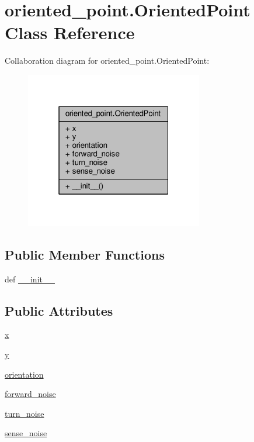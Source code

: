 \hypertarget{classoriented__point_1_1OrientedPoint}{\section{oriented\-\_\-point.\-Oriented\-Point Class Reference}
\label{classoriented__point_1_1OrientedPoint}
}


Collaboration diagram for oriented\-\_\-point.\-Oriented\-Point\-:\nopagebreak
\begin{figure}[H]
\begin{center}
\leavevmode
\includegraphics[width=220pt]{classoriented__point_1_1OrientedPoint__coll__graph}
\end{center}
\end{figure}
\subsection*{Public Member Functions}
\begin{DoxyCompactItemize}
\item 
def \hyperlink{classoriented__point_1_1OrientedPoint_a01289ef0dcb80af4b61c4c8352c82639}{\-\_\-\-\_\-init\-\_\-\-\_\-}
\end{DoxyCompactItemize}
\subsection*{Public Attributes}
\begin{DoxyCompactItemize}
\item 
\hyperlink{classoriented__point_1_1OrientedPoint_a020fc32ac0c377591b1d7686c66310ac}{x}
\item 
\hyperlink{classoriented__point_1_1OrientedPoint_a9f9f32b6143828eefe2c768680b9ac44}{y}
\item 
\hyperlink{classoriented__point_1_1OrientedPoint_a7a95e72e5f5ac1de5d3c1314c19a8c5d}{orientation}
\item 
\hyperlink{classoriented__point_1_1OrientedPoint_a5e69ec880e4e02b4c6cbf7b7b528eaf0}{forward\-\_\-noise}
\item 
\hyperlink{classoriented__point_1_1OrientedPoint_a2f90057368b176f551cf9c94166724bd}{turn\-\_\-noise}
\item 
\hyperlink{classoriented__point_1_1OrientedPoint_a6a5ce78d8ea5234a60920f7e0e3c485d}{sense\-\_\-noise}
\end{DoxyCompactItemize}


